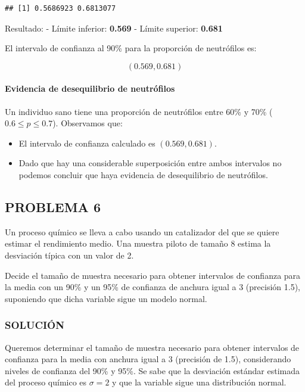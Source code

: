 \documentclass[
]{article}
\begin{document}
\begin{verbatim}
## [1] 0.5686923 0.6813077
\end{verbatim}

Resultado:
- Límite inferior: \textbf{0.569}
- Límite superior: \textbf{0.681}

El intervalo de confianza al 90\% para la proporción de neutrófilos es:

\[ (0.569, 0.681) \]

\paragraph{Evidencia de desequilibrio de neutrófilos}\label{evidencia-de-desequilibrio-de-neutruxf3filos}

Un individuo sano tiene una proporción de neutrófilos entre 60\% y 70\% (\(0.6 \leq p \leq 0.7\)). Observamos que:

\begin{itemize}
\item
  El intervalo de confianza calculado es \((0.569, 0.681)\).
\item
  Dado que hay una considerable superposición entre ambos intervalos no podemos concluir que haya evidencia de desequilibrio de neutrófilos.
\end{itemize}

\subsection{PROBLEMA 6}\label{problema-6}

Un proceso químico se lleva a cabo usando un catalizador del que se quiere estimar el rendimiento medio. Una muestra piloto de tamaño 8 estima la desviación típica con un valor de 2.

Decide el tamaño de muestra necesario para obtener intervalos de confianza para la media con un 90\% y un 95\% de confianza de anchura igual a 3 (precisión 1.5), suponiendo que dicha variable sigue un modelo normal.

\subsubsection{SOLUCIÓN}\label{soluciuxf3n-20}

Queremos determinar el tamaño de muestra necesario para obtener intervalos de confianza para la media con anchura igual a 3 (precisión de 1.5), considerando niveles de confianza del 90\% y 95\%. Se sabe que la desviación estándar estimada del proceso químico es \(\sigma = 2\) y que la variable sigue una distribución normal.
\end{document}
